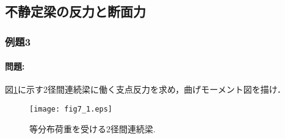 ﻿\documentclass[10pt,a4j]{jarticle}
\begin{document}
\subsection{不静定梁の反力と断面力}
\subsubsection{例題3}
\paragraph{問題:}
図\ref{fig:fig7_1}に示す2径間連続梁に働く支点反力を求め，曲げモーメント図を描け．
\begin{figure}[h]
	\begin{center}
	\texttt{[image: fig7\_1.eps]} 
	\end{center}
	\caption{等分布荷重を受ける2径間連続梁.} 
	\label{fig:fig7_1}
\end{figure}
\end{document}
